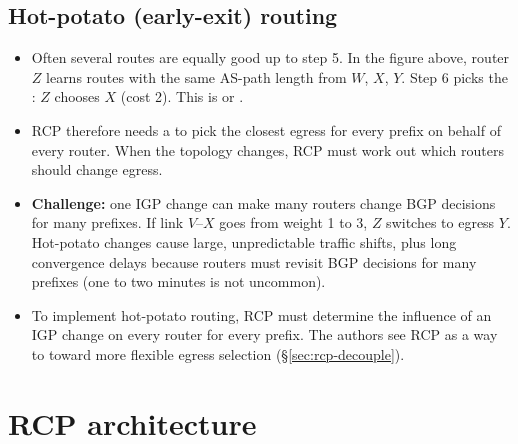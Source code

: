 \subsection{Hot-potato (early-exit) routing}
\begin{itemize}
\item Often several routes are equally good up to step 5. In the figure above, router $Z$ learns routes with the same AS-path length from $W$, $X$, $Y$. Step 6 picks the : $Z$ chooses $X$ (cost 2). This is  or .
\item RCP therefore needs a  to pick the closest egress for every prefix on behalf of every router. When the topology changes, RCP must work out which routers should change egress.
\item \textbf{Challenge:} one IGP change can make many routers change BGP decisions for many prefixes. If link $V$--$X$ goes from weight 1 to 3, $Z$ switches to egress $Y$. Hot-potato changes cause large, unpredictable traffic shifts, plus long convergence delays because routers must revisit BGP decisions for many prefixes (one to two minutes is not uncommon).
\item To implement hot-potato routing, RCP must determine the influence of an IGP change on every router for every prefix. The authors see RCP as a way to  toward more flexible egress selection (\S\ref{sec:rcp-decouple}).
\end{itemize}

\section{RCP architecture}

